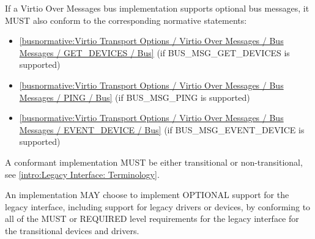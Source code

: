 If a Virtio Over Messages bus implementation supports optional bus messages, it
MUST also conform to the corresponding normative statements:

\begin{itemize}
\item \ref{busnormative:Virtio Transport Options / Virtio Over Messages / Bus Messages / GET_DEVICES / Bus} (if BUS_MSG_GET_DEVICES is supported)
\item \ref{busnormative:Virtio Transport Options / Virtio Over Messages / Bus Messages / PING / Bus} (if BUS_MSG_PING is supported)
\item \ref{busnormative:Virtio Transport Options / Virtio Over Messages / Bus Messages / EVENT_DEVICE / Bus} (if BUS_MSG_EVENT_DEVICE is supported)
\end{itemize}

\label{sec:Conformance / Legacy Interface: Transitional Device and Transitional Driver Conformance}
A conformant implementation MUST be either transitional or
non-transitional, see \ref{intro:Legacy
Interface: Terminology}.

An implementation MAY choose to implement OPTIONAL support for the
legacy interface, including support for legacy drivers
or devices, by conforming to all of the MUST or
REQUIRED level requirements for the legacy interface
for the transitional devices and drivers.

